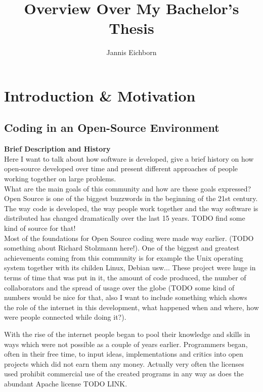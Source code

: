 \documentclass[11p]{scrartcl}
\title{Overview Over My Bachelor's Thesis}
\author{Jannis Eichborn}
\begin{document}
\begin{titlepage}
\maketitle
\tableofcontents
\end{titlepage}

\section{Introduction \& Motivation}
\label{sec:introduction}
\subsection{Coding in an Open-Source Environment}

\textbf{Brief Description and History}\\
Here I want to talk about how software is developed, give a brief history on how open-source developed over time and present different approaches of people working together on large problems. \\
What are the main goals of this community and how are these goals expressed?\\

Open Source is one of the biggest buzzwords in the beginning of the 21st century. The way code is developed, the way people work together and the way software is distributed has changed dramatically over the last 15 years. TODO find some kind of source for that!\\

Most of the foundations for Open Source coding were made way earlier. (TODO something about Richard Stolzmann here!). One of the biggest and greatest achievements coming from this community is for example the Unix operating system together with its childen Linux, Debian usw...
These project were huge in terms of time that was put in it, the amount of code produced, the number of collaborators and the spread of usage over the globe (TODO some kind of numbers would be nice for that, also I want to include something which shows the role of the internet in this development, what happened when and where, how were people connected while doing it?).

With the rise of the internet people began to pool their knowledge and skills in ways which were not possible as a couple of years earlier. Programmers began, often in their free time, to input ideas, implementations and critics into open projects which did not earn them any money. Actually very often the licenses used prohibit commercial use of the created programs in any way as does the abundant Apache license TODO LINK.
\end{document}
